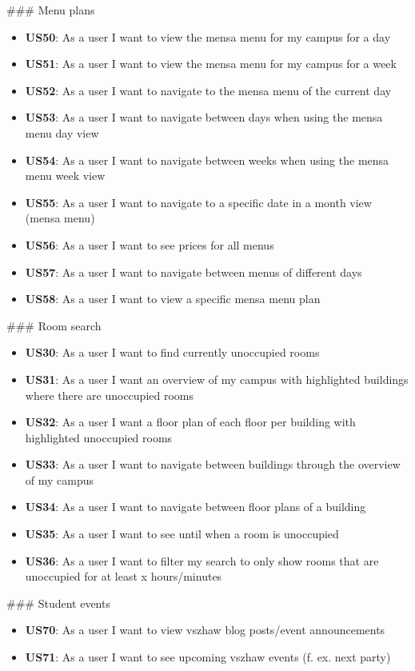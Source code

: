 \begin{markdown}
### Menu plans

\begin{itemize}
  \item \textbf{US50}: As a user I want to view the mensa menu for my campus for a day
  \item \textbf{US51}: As a user I want to view the mensa menu for my campus for a week
  \item \textbf{US52}: As a user I want to navigate to the mensa menu of the current day
  \item \textbf{US53}: As a user I want to navigate between days when using the mensa menu day view
  \item \textbf{US54}: As a user I want to navigate between weeks when using the mensa menu week view
  \item \textbf{US55}: As a user I want to navigate to a specific date in a month view (mensa menu)
  \item \textbf{US56}: As a user I want to see prices for all menus
  \item \textbf{US57}: As a user I want to navigate between menus of different days
  \item \textbf{US58}: As a user I want to view a specific mensa menu plan
\end{itemize}

### Room search

\begin{itemize}
  \item \textbf{US30}: As a user I want to find currently unoccupied rooms
  \item \textbf{US31}: As a user I want an overview of my campus with highlighted buildings where there are unoccupied rooms
  \item \textbf{US32}: As a user I want a floor plan of each floor per building with highlighted unoccupied rooms
  \item \textbf{US33}: As a user I want to navigate between buildings through the overview of my campus
  \item \textbf{US34}: As a user I want to navigate between floor plans of a building
  \item \textbf{US35}: As a user I want to see until when a room is unoccupied
  \item \textbf{US36}: As a user I want to filter my search to only show rooms that are unoccupied for at least x hours/minutes
\end{itemize}

### Student events

\begin{itemize}
  \item \textbf{US70}: As a user I want to view vszhaw blog posts/event announcements
  \item \textbf{US71}: As a user I want to see upcoming vszhaw events (f. ex. next party)
\end{itemize}

\end{markdown}
